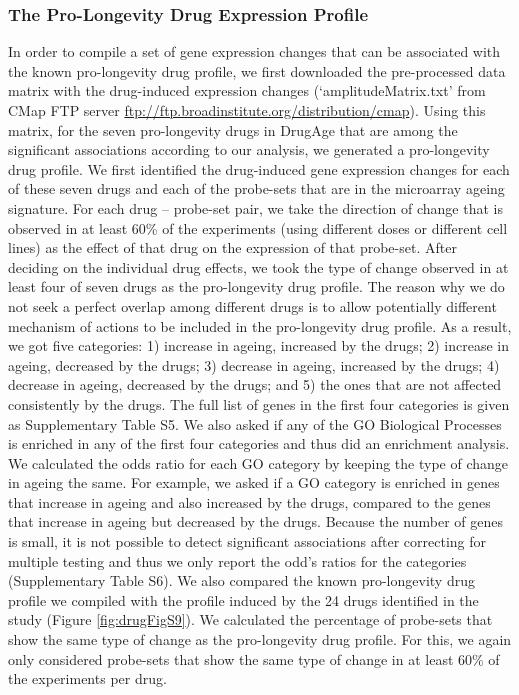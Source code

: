 \documentclass[12pt,twoside]{unicam}
\begin{document}
\hypertarget{drugProExpProf}{%
\subsubsection{The Pro-Longevity Drug Expression Profile}\label{drugProExpProf}}

In order to compile a set of gene expression changes that can be associated with the known pro-longevity drug profile, we first downloaded the pre-processed data matrix with the drug-induced expression changes (`amplitudeMatrix.txt' from CMap FTP server \url{ftp://ftp.broadinstitute.org/distribution/cmap}). Using this matrix, for the seven pro-longevity drugs in DrugAge that are among the significant associations according to our analysis, we generated a pro-longevity drug profile. We first identified the drug-induced gene expression changes for each of these seven drugs and each of the probe-sets that are in the microarray ageing signature. For each drug -- probe-set pair, we take the direction of change that is observed in at least 60\% of the experiments (using different doses or different cell lines) as the effect of that drug on the expression of that probe-set. After deciding on the individual drug effects, we took the type of change observed in at least four of seven drugs as the pro-longevity drug profile. The reason why we do not seek a perfect overlap among different drugs is to allow potentially different mechanism of actions to be included in the pro-longevity drug profile. As a result, we got five categories: 1) increase in ageing, increased by the drugs; 2) increase in ageing, decreased by the drugs; 3) decrease in ageing, increased by the drugs; 4) decrease in ageing, decreased by the drugs; and 5) the ones that are not affected consistently by the drugs. The full list of genes in the first four categories is given as Supplementary Table S5. We also asked if any of the GO Biological Processes is enriched in any of the first four categories and thus did an enrichment analysis. We calculated the odds ratio for each GO category by keeping the type of change in ageing the same. For example, we asked if a GO category is enriched in genes that increase in ageing and also increased by the drugs, compared to the genes that increase in ageing but decreased by the drugs. Because the number of genes is small, it is not possible to detect significant associations after correcting for multiple testing and thus we only report the odd's ratios for the categories (Supplementary Table S6). We also compared the known pro-longevity drug profile we compiled with the profile induced by the 24 drugs identified in the study (Figure \ref{fig:drugFigS9}). We calculated the percentage of probe-sets that show the same type of change as the pro-longevity drug profile. For this, we again only considered probe-sets that show the same type of change in at least 60\% of the experiments per drug.
\end{document}
